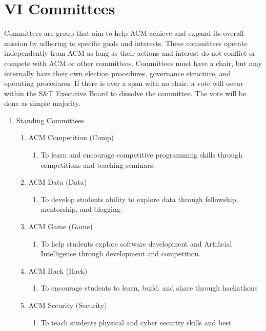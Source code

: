 
\section{VI \textendash{} Committees}
Committees are group that aim to help ACM achieve and expand its overall mission
by adhering to specific goals and interests. These committees operate
independently from ACM as long as their actions and interest do not conflict or
compete with ACM or other committees. Committees must have a chair, but may
internally have their own election procedures, governance structure, and
operating procedures. If there is ever a span with no chair, a vote will occur
within the S\&T Executive Board to dissolve the committee. The vote will be done
as simple majority.
\begin{enumerate}[label=\Alph*.]
  \item Standing Committees
    \begin{enumerate}
      \item ACM Competition (Comp)
        \begin{enumerate}
          \item To learn and encourage competitive programming skills through
          competitions and teaching seminars.
        \end{enumerate}
      \item ACM Data (Data)
        \begin{enumerate}
          \item To develop students ability to explore data through fellowship,
            mentorship, and blogging.
        \end{enumerate}
      \item ACM Game (Game)
        \begin{enumerate}
          \item To help students explore software development and Artificial
            Intelligence through development and competition.
        \end{enumerate}
      \item ACM Hack (Hack)
        \begin{enumerate}
          \item To encourage students to learn, build, and share through
            hackathons
        \end{enumerate}
      \item ACM Security (Security)
        \begin{enumerate}
          \item To teach students physical and cyber security skills and best

\end{enumerate}
\end{enumerate}
\end{enumerate}
